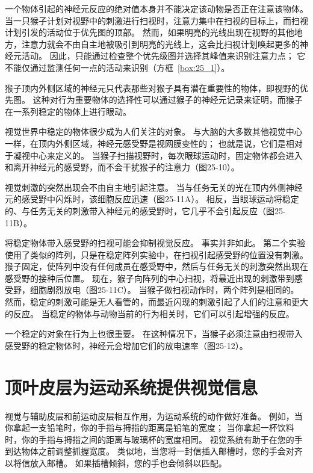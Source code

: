 一个物体引起的神经元反应的绝对值本身并不能决定该动物是否正在注意该物体。
当一只猴子计划对视野中的刺激进行扫视时，注意力集中在扫视的目标上，而扫视计划引发的活动位于优先图的顶部。
然而，如果明亮的光线出现在视野的其他地方，注意力就会不由自主地被吸引到明亮的光线上，这会比扫视计划唤起更多的神经元活动。
因此，只能通过检查整个优先级图并选择其峰值来识别注意力点；
它不能仅通过监测任何一点的活动来识别（方框~\ref{box:25_1}）。


\begin{proposition}[顶叶皮层的优先级图] \label{box:25_1}
	
	\quad \quad 猴子顶内外侧区域的神经元只代表那些对猴子具有潜在重要性的物体，即视野的优先图。
	这种对行为重要物体的选择性可以通过猴子的神经元记录来证明，而猴子在一系列稳定的物体上进行眼动。
	
	\quad \quad 视觉世界中稳定的物体很少成为人们关注的对象。
	与大脑的大多数其他视觉中心一样，在顶内外侧区域，神经元感受野是视网膜变性的；
	也就是说，它们是相对于凝视中心来定义的。
	当猴子扫描视野时，每次眼球运动时，固定物体都会进入和离开神经元的感受野，而不会干扰猴子的注意力（图25-10）。
	
	\quad \quad 视觉刺激的突然出现会不由自主地引起注意。
	当与任务无关的光在顶内外侧神经元的感受野中闪烁时，该细胞反应迅速（图25-11A）。
	相反，当眼球运动将稳定的、与任务无关的刺激带入神经元的感受野时，它几乎不会引起反应（图25-11B）。
	
	\quad \quad 将稳定物体带入感受野的扫视可能会抑制视觉反应。
	事实并非如此。
	第二个实验使用了类似的阵列，只是在稳定阵列实验中，在扫视引起感受野的位置没有刺激。
	猴子固定，使阵列中没有任何成员在感受野中，然后与任务无关的刺激突然出现在感受野的接种后位置。
	现在，猴子向阵列的中心扫视，将最近出现的刺激带到感受野，细胞剧烈放电（图25-11C）。
	当猴子做扫视动作时，两个阵列是相同的。
	然而，稳定的刺激可能是无人看管的，而最近闪现的刺激引起了人们的注意和更大的反应。
	当稳定的物体与动物当前的行为相关时，它们可以引起增强的反应。
	
	\quad \quad 一个稳定的对象在行为上也很重要。
	在这种情况下，当猴子必须注意由扫视带入感受野的稳定物体时，神经元会增加它们的放电速率（图25-12）。
	
\end{proposition}



\section{顶叶皮层为运动系统提供视觉信息}

视觉与辅助皮层和前运动皮层相互作用，为运动系统的动作做好准备。
例如，当你拿起一支铅笔时，你的手指与拇指的距离是铅笔的宽度；
当你拿起一杯饮料时，你的手指与拇指之间的距离与玻璃杯的宽度相同。
视觉系统有助于在您的手到达物体之前调整抓握宽度。
类似地，当您将一封信插入邮槽时，您的手会对齐以将信放入邮槽。
如果插槽倾斜，您的手也会倾斜以匹配。


